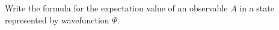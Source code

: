 

\vspace*{\fill}
\centering

Write the formula for the expectation value of an observable $A$ in a state represented by wavefunction $\Psi$.

\centering
\vspace*{\fill}

